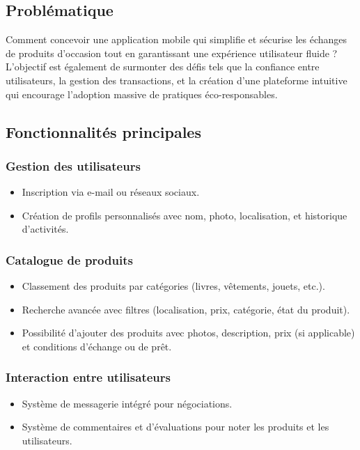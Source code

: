 \documentclass[12pt,a4paper]{report}
\begin{document}
	\subsection{Problématique}
	Comment concevoir une application mobile qui simplifie et sécurise les échanges de produits d'occasion tout en garantissant une expérience utilisateur fluide ? L'objectif est également de surmonter des défis tels que la confiance entre utilisateurs, la gestion des transactions, et la création d'une plateforme intuitive qui encourage l'adoption massive de pratiques éco-responsables.
	
	\subsection{Fonctionnalités principales}
	\subsubsection{Gestion des utilisateurs}
	\begin{itemize}
		\item Inscription via e-mail ou réseaux sociaux.
		\item Création de profils personnalisés avec nom, photo, localisation, et historique d'activités.
	\end{itemize}
	
	\subsubsection{Catalogue de produits}
	\begin{itemize}
		\item Classement des produits par catégories (livres, vêtements, jouets, etc.).
		\item Recherche avancée avec filtres (localisation, prix, catégorie, état du produit).
		\item Possibilité d'ajouter des produits avec photos, description, prix (si applicable) et conditions d'échange ou de prêt.
	\end{itemize}
	
	\subsubsection{Interaction entre utilisateurs}
	\begin{itemize}
		\item Système de messagerie intégré pour négociations.
		\item Système de commentaires et d'évaluations pour noter les produits et les utilisateurs.
	\end{itemize}
	
\end{document}
